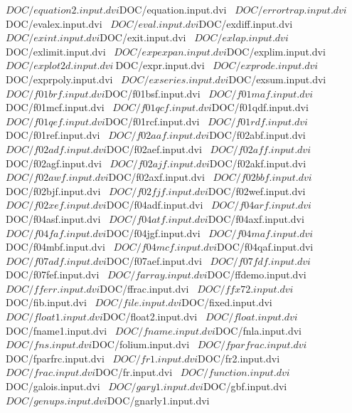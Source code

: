 \documentclass{article}
\begin{document}
  ${DOC}/equation2.input.dvi   ${DOC}/equation.input.dvi   \
  ${DOC}/errortrap.input.dvi   ${DOC}/evalex.input.dvi     \
  ${DOC}/eval.input.dvi        ${DOC}/exdiff.input.dvi     \
  ${DOC}/exint.input.dvi       ${DOC}/exit.input.dvi       \
  ${DOC}/exlap.input.dvi       ${DOC}/exlimit.input.dvi    \
  ${DOC}/expexpan.input.dvi    ${DOC}/explim.input.dvi     \
  ${DOC}/explot2d.input.dvi    \
  ${DOC}/expr.input.dvi        \
  ${DOC}/exprode.input.dvi     ${DOC}/exprpoly.input.dvi   \
  ${DOC}/exseries.input.dvi    ${DOC}/exsum.input.dvi      \
  ${DOC}/f01brf.input.dvi      ${DOC}/f01bsf.input.dvi     \
  ${DOC}/f01maf.input.dvi      ${DOC}/f01mcf.input.dvi     \
  ${DOC}/f01qcf.input.dvi      ${DOC}/f01qdf.input.dvi     \
  ${DOC}/f01qef.input.dvi      ${DOC}/f01rcf.input.dvi     \
  ${DOC}/f01rdf.input.dvi      ${DOC}/f01ref.input.dvi     \
  ${DOC}/f02aaf.input.dvi      ${DOC}/f02abf.input.dvi     \
  ${DOC}/f02adf.input.dvi      ${DOC}/f02aef.input.dvi     \
  ${DOC}/f02aff.input.dvi      ${DOC}/f02agf.input.dvi     \
  ${DOC}/f02ajf.input.dvi      ${DOC}/f02akf.input.dvi     \
  ${DOC}/f02awf.input.dvi      ${DOC}/f02axf.input.dvi     \
  ${DOC}/f02bbf.input.dvi      ${DOC}/f02bjf.input.dvi     \
  ${DOC}/f02fjf.input.dvi      ${DOC}/f02wef.input.dvi     \
  ${DOC}/f02xef.input.dvi      ${DOC}/f04adf.input.dvi     \
  ${DOC}/f04arf.input.dvi      ${DOC}/f04asf.input.dvi     \
  ${DOC}/f04atf.input.dvi      ${DOC}/f04axf.input.dvi     \
  ${DOC}/f04faf.input.dvi      ${DOC}/f04jgf.input.dvi     \
  ${DOC}/f04maf.input.dvi      ${DOC}/f04mbf.input.dvi     \
  ${DOC}/f04mcf.input.dvi      ${DOC}/f04qaf.input.dvi     \
  ${DOC}/f07adf.input.dvi      ${DOC}/f07aef.input.dvi     \
  ${DOC}/f07fdf.input.dvi      ${DOC}/f07fef.input.dvi     \
  ${DOC}/farray.input.dvi      ${DOC}/ffdemo.input.dvi     \
  ${DOC}/fferr.input.dvi       ${DOC}/ffrac.input.dvi      \
  ${DOC}/ffx72.input.dvi       ${DOC}/fib.input.dvi        \
  ${DOC}/file.input.dvi        ${DOC}/fixed.input.dvi      \
  ${DOC}/float1.input.dvi      ${DOC}/float2.input.dvi     \
  ${DOC}/float.input.dvi       ${DOC}/fname1.input.dvi     \
  ${DOC}/fname.input.dvi       ${DOC}/fnla.input.dvi       \
  ${DOC}/fns.input.dvi         ${DOC}/folium.input.dvi     \
  ${DOC}/fparfrac.input.dvi    ${DOC}/fparfrc.input.dvi    \
  ${DOC}/fr1.input.dvi         ${DOC}/fr2.input.dvi        \
  ${DOC}/frac.input.dvi        ${DOC}/fr.input.dvi         \
  ${DOC}/function.input.dvi    ${DOC}/galois.input.dvi     \
  ${DOC}/gary1.input.dvi       ${DOC}/gbf.input.dvi        \
  ${DOC}/genups.input.dvi      ${DOC}/gnarly1.input.dvi    \
\end{document}
